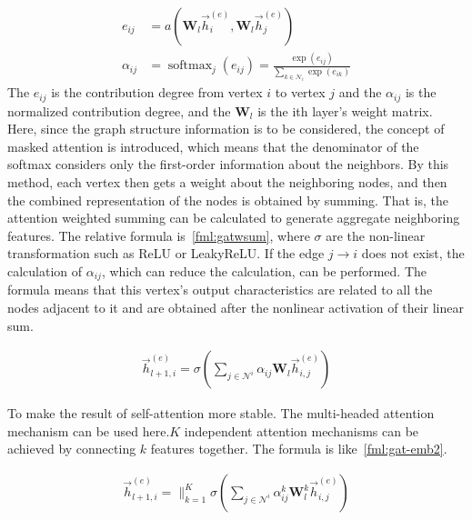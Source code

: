 \begin{align}
    e_{ij}      & =a(\mathbf{W}_l\overrightarrow{h}^{(e)}_i, \mathbf{W}_l\overrightarrow{h}^{(e)}_j)    \label{fml:gatembeij}                \\
    \alpha_{ij} & =\operatorname{softmax}_{j}(e_{ij})=\frac{\exp(e_{ij})}{\sum_{k\in \mathcal{N}_{i}}\exp(e_{ik})} \label{fml:gatembalphaij}
\end{align}
The \(e_{ij}\) is the contribution degree from vertex \(i\) to vertex \(j\) and the \(\alpha_{ij} \) is the normalized contribution degree, and the \(\mathbf{W}_l\) is the ith layer's weight matrix. Here, since the graph structure information is to be considered, the concept of masked attention is introduced, which means that the denominator of the softmax considers only the first-order information about the neighbors. By this method, each vertex then gets a weight about the neighboring nodes, and then the combined representation of the nodes is obtained by summing. That is, the attention weighted summing can be calculated to generate aggregate neighboring features. The relative formula is~\ref{fml:gatwsum}, where \(\sigma \) are the non-linear transformation such as ReLU or LeakyReLU. If the edge \(j \to i\) does not exist,  the calculation of \(\alpha_{ij}\), which can reduce the calculation, can be performed. The formula means that this vertex's output characteristics are related to all the nodes adjacent to it and are obtained after the nonlinear activation of their linear sum.

\begin{align}
    \overrightarrow{h}^{(e)}_{l+1,i}=\sigma(\sum_{j \in \mathcal{N}^i} \alpha_{i j} \mathbf{W}_l \overrightarrow{h}^{(e)}_{i,j})\label{fml:gatwsum}
\end{align}



To make the result of self-attention more stable. The multi-headed attention mechanism can be used here.\(K\) independent attention mechanisms can be achieved by connecting \(k\) features together. The formula is like~\ref{fml:gat-emb2}.

\begin{align}
    \overrightarrow{h}^{(e)}_{l+1,i}=\|_{k=1}^{K} \sigma(\sum_{j \in \mathcal{N}^i} \alpha_{i j}^{k} \mathbf{W}_l^{k} \overrightarrow{h}^{(e)}_{i,j})\label{fml:gat-emb2}
\end{align}

